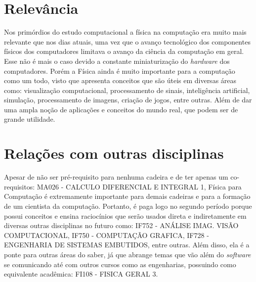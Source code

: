 \documentclass[12pt]{article}
\begin{document}
\section{Relevância}
\par
Nos primórdios do estudo computacional a física na computação era muito mais relevante que nos dias atuais, uma vez que o avanço tecnológico dos componentes físicos dos computadores limitava o avanço da ciência da computação em geral. Esse não é mais o caso devido a constante miniaturização do \textit{hardware} dos computadores. Porém a Física ainda é muito importante para a computação como um todo, visto que apresenta conceitos que são úteis em diversas áreas como: visualização computacional, processamento de sinais, inteligência artificial, simulação, processamento de imagens, criação de jogos, entre outras. Além de dar uma ampla noção de aplicações e conceitos do mundo real, que podem ser de grande utilidade.
\cite{fonte:zzz}
\cite{fonte:www}

\section{Relações com outras disciplinas}
\par
Apesar de não ser pré-requisito para nenhuma cadeira e de ter apenas um co-requisitos: MA026 - CALCULO DIFERENCIAL E INTEGRAL 1, Física para Computação é extremamente importante para demais cadeiras e para a formação de um cientista da computação. Portanto, é paga logo no segundo período porque possui conceitos e ensina raciocínios que serão usados direta e indiretamente em diversas outras disciplinas no futuro como: IF752 - ANÁLISE IMAG. VISÃO COMPUTACIONAL, IF750 - COMPUTAÇÃO GRAFICA, IF728 - ENGENHARIA DE SISTEMAS EMBUTIDOS, entre outras. Além disso, ela é a ponte para outras áreas do saber, já que abrange temas que vão além do \textit{software} se comunicando até com outros cursos como as engenharias, possuindo como equivalente acadêmica: FI108 - FISICA GERAL 3.
\cite{fonte:yyy}




\end{document}
